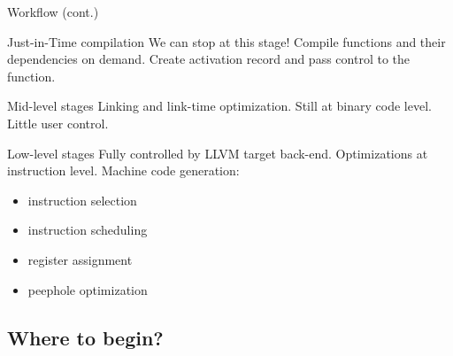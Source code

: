 \documentclass[8pt]{beamer}
\begin{document}
\begin{frame}{Workflow (cont.)}
  \begin{block}{Just-in-Time compilation}
    We can stop at this stage! Compile functions and their dependencies on
    demand. Create activation record and pass control to the function.
  \end{block}

  \begin{block}{Mid-level stages}
    Linking and link-time optimization. Still at binary code level. Little user
    control.
  \end{block}

  \begin{block}{Low-level stages}
    Fully controlled by LLVM target back-end. Optimizations at instruction
    level. Machine code generation:
    \begin{itemize}
      \item instruction selection
      \item instruction scheduling
      \item register assignment
      \item peephole optimization
    \end{itemize}
  \end{block}
\end{frame}

\subsection*{Where to begin?}
\end{document}
